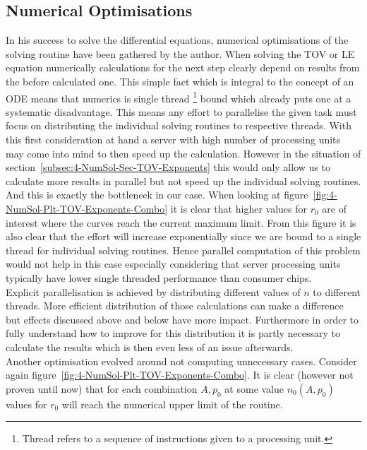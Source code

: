 \subsection{Numerical Optimisations}
\label{subsec:99-App-Numerical-Optimisations}
In his success to solve the differential equations, numerical optimisations of the solving routine have been gathered by the author.
When solving the \ac{TOV} or \ac{LE} equation numerically calculations for the next step clearly depend on results from the before calculated one.
This simple fact which is integral to the concept of an \ac{ODE} means that numerics is single thread \footnote{Thread refers to a sequence of instructions given to a processing unit.} bound which already puts one at a systematic disadvantage.
This means any effort to parallelise the given task must focus on distributing the individual solving routines to respective threads.
With this first consideration at hand a server with high number of processing units may come into mind to then speed up the calculation.
However in the situation of section~\ref{subsec:4-NumSol-Sec-TOV-Exponents} this would only allow us to calculate more results in parallel but not speed up the individual solving routines.
And this is exactly the bottleneck in our case.
When looking at figure~\ref{fig:4-NumSol-Plt-TOV-Exponents-Combo} it is clear that higher values for $r_0$ are of interest where the curves reach the current maximum limit.
From this figure it is also clear that the effort will increase exponentially since we are bound to a single thread for individual solving routines.
Hence parallel computation of this problem would not help in this case especially considering that server processing units typically have lower single threaded performance than consumer chips.\\
Explicit parallelisation is achieved by distributing different values of $n$ to different threads.
More efficient distribution of those calculations can make a difference but effects discussed above and below have more impact.
Furthermore in order to fully understand how to improve for this distribution it is partly necessary to calculate the results which is then even less of an issue afterwards.\\
Another optimisation evolved around not computing unnecessary cases.
Consider again figure~\ref{fig:4-NumSol-Plt-TOV-Exponents-Combo}.
It is clear (however not proven until now) that for each combination $A,p_0$ at some value $n_0(A,p_0)$ values for $r_0$ will reach the numerical upper limit of the routine.
